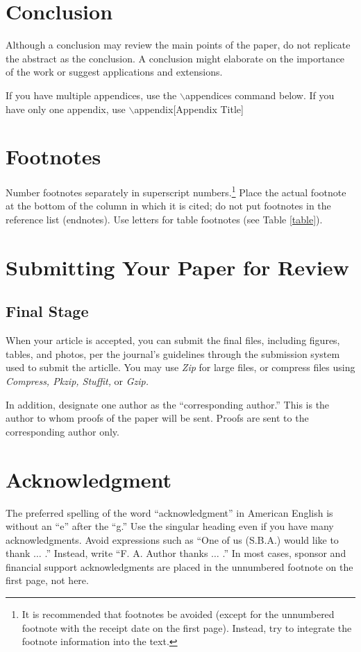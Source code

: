 \documentclass{ieeeaccess}
\begin{document}
\section{Conclusion}
Although a conclusion may review the  main points of the paper, do not replicate the abstract as the conclusion. A
conclusion might elaborate on the importance of the work or suggest
applications and extensions.

If you have multiple appendices, use the $\backslash$appendices command below. If you have only one appendix, use
$\backslash$appendix[Appendix Title]

\appendices
\section{\break Footnotes}
Number footnotes separately in superscript numbers.\footnote{It is recommended that footnotes be avoided (except for
the unnumbered footnote with the receipt date on the first page). Instead,
try to integrate the footnote information into the text.} Place the actual
footnote at the bottom of the column in which it is cited; do not put
footnotes in the reference list (endnotes). Use letters for table footnotes
(see Table \ref{table}).

\section{\break Submitting Your Paper for Review}

\subsection{Final Stage}
When your article is accepted, you can submit the final files, including figures, tables, and photos, per the journal's guidelines through the submission system used to submit the articlle.
 You may use \emph{Zip} for large files, or compress files using \emph{Compress, Pkzip, Stuffit,} or \emph{Gzip.}

In addition, designate one author as the ``corresponding author.'' This is the author to
whom proofs of the paper will be sent. Proofs are sent to the corresponding
author only.


\section*{Acknowledgment}
The preferred spelling of the word ``acknowledgment'' in American English is
without an ``e'' after the ``g.'' Use the singular heading even if you have
many acknowledgments. Avoid expressions such as ``One of us (S.B.A.) would
like to thank $\ldots$ .'' Instead, write ``F. A. Author thanks $\ldots$ .'' In most
cases, sponsor and financial support acknowledgments are placed in the
unnumbered footnote on the first page, not here.
\end{document}
